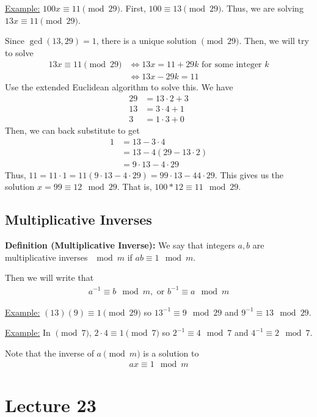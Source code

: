 \documentclass{article}
\begin{document}
\underline{Example:} $100x\equiv 11\pmod{29}$. First, $100\equiv 13\pmod{29}$. Thus, we are solving $13x\equiv 11\pmod{29}$. 

Since $\gcd(13,29)=1$, there is a unique solution $\pmod{29}$. Then, we will try to solve \begin{align*}
    13x\equiv 11\pmod{29}&\iff 13x=11+29k\text{ for some integer } k\\
    &\iff 13x-29k=11
\end{align*}Use the extended Euclidean algorithm to solve this. We have \begin{align*}
    29&=13\cdot 2+3\\
    13&=3\cdot 4+1\\
    3&=1\cdot 3+0
\end{align*}Then, we can back substitute to get \begin{align*}
    1&=13-3\cdot 4\\
    &=13-4(29-13\cdot 2)\\
    &=9\cdot 13-4\cdot 29
\end{align*}Thus, $11=11\cdot 1=11(9\cdot 13-4\cdot 29)=99\cdot 13-44\cdot 29$. This gives us the solution $x=99\equiv 12\mod 29$. That is, $100*12\equiv 11\mod 29$.

\subsection{Multiplicative Inverses}

\textbf{Definition (Multiplicative Inverse):} We say that integers $a,b$ are multiplicative inverses $\mod m$ if $ab\equiv 1\mod m$.

Then we will write that \begin{align*}
    a^{-1}\equiv b\mod m, \text{ or } b^{-1}\equiv a\mod m
\end{align*}

\underline{Example:} $(13)(9)\equiv 1\pmod{29}$ so $13^{-1}\equiv 9\mod 29$ and $9^{-1}\equiv 13\mod 29$.

\underline{Example:} In $\pmod 7$, $2\cdot 4\equiv 1\pmod 7$ so $2^{-1}\equiv 4\mod 7$ and $4^{-1}\equiv 2\mod 7$.

Note that the inverse of $a\pmod m$ is a solution to \begin{align*}
    ax\equiv 1\mod m
\end{align*}

\section{Lecture 23}
\end{document}
